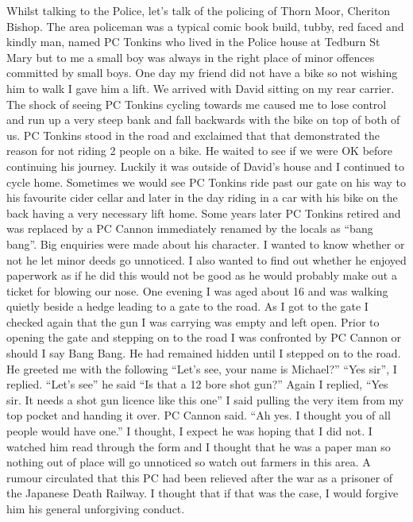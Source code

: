 Whilst talking to the Police, let's talk of the policing of Thorn Moor, Cheriton
Bishop. The area policeman was a typical comic book build, tubby, red faced and
kindly man, named PC Tonkins who lived in the Police house at Tedburn St Mary
but to me a small boy was always in the right place of minor offences committed
by small boys. One day my friend did not have a bike so not wishing him to walk
I gave him a lift. We arrived with David sitting on my rear carrier. The shock
of seeing PC Tonkins cycling towards me caused me to lose control and run up a
very steep bank and fall backwards with the bike on top of both of us. PC
Tonkins stood in the road and exclaimed that that demonstrated the reason for
not riding 2 people on a bike. He waited to see if we were OK before continuing
his journey. Luckily it was outside of David's house and I continued to cycle
home. Sometimes we would see PC Tonkins ride past our gate on his way to his
favourite cider cellar and later in the day riding in a car with his bike on
the back having a very necessary lift home. Some years later PC Tonkins retired
and was replaced by a PC Cannon immediately renamed by the locals as ``bang
bang''. Big enquiries were made about his character. I wanted to know whether
or not he let minor deeds go unnoticed. I also wanted to find out whether he
enjoyed paperwork as if he did this would not be good as he would probably make
out a ticket for blowing our nose. One evening I was aged about 16 and was
walking quietly beside a hedge leading to a gate to the road. As I got to the
gate I checked again that the gun I was carrying was empty and left open. Prior
to opening the gate and stepping on to the road I was confronted by PC Cannon
or should I say Bang Bang. He had remained hidden until I stepped on to the
road. He greeted me with the following ``Let's see, your name is Michael?''
``Yes sir'', I replied. ``Let's see'' he said ``Is that a 12 bore shot gun?''
Again I replied, ``Yes sir. It needs a shot gun licence like this one'' I said
pulling the very item from my top pocket and handing it over. PC Cannon said.
``Ah yes. I thought you of all people would have one.'' I thought, I expect he
was hoping that I did not. I watched him read through the form and I thought
that he was a paper man so nothing out of place will go unnoticed so watch out
farmers in this area. A rumour circulated that this PC had been relieved after
the war as a prisoner of the Japanese Death Railway. I thought that if that was
the case, I would forgive him his general unforgiving conduct.

